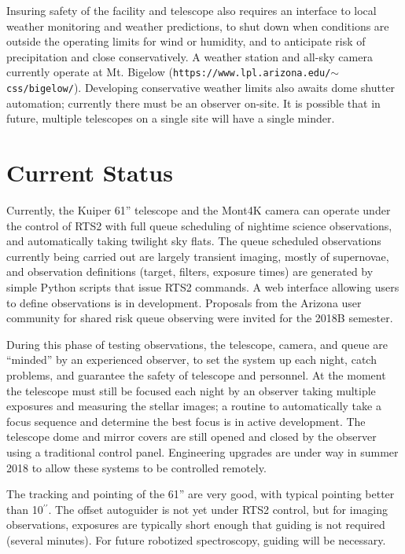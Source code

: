\documentclass[]{spie}  %
\def\arcsec{$^{\prime\prime}$}
\begin{document}
Insuring safety of the facility and telescope also requires an interface to local weather monitoring and weather predictions, to shut down when conditions are outside the operating limits for wind or humidity, and to anticipate risk of precipitation and close conservatively.  A weather station and all-sky camera currently operate at Mt. Bigelow ({\tt https://www.lpl.arizona.edu/$\sim$css/bigelow/}). Developing conservative weather limits also awaits dome shutter automation; currently there must be an observer on-site. It is possible that in future, multiple telescopes on a single site will have a single minder.

\section{Current Status}

Currently, the Kuiper 61'' telescope and the Mont4K camera can operate under the control of RTS2 with full queue scheduling of nightime science observations, and automatically taking twilight sky flats. 
The queue scheduled observations currently being carried out are largely transient imaging, mostly of supernovae, and observation definitions (target, filters, exposure times) are generated by simple Python scripts that issue RTS2 commands.  A web interface allowing users to define observations is in development. Proposals from the Arizona user community for shared risk queue observing were invited for the 2018B semester. 
 
During this phase of testing observations, the telescope, camera, and queue are ``minded'' by an experienced observer, to set the system up each night, catch problems, and guarantee the safety of telescope and personnel.
At the moment the telescope must still be focused each night by an observer taking multiple exposures and measuring the stellar images; a routine to automatically take a focus sequence and determine the best focus is in active development.  The telescope dome and mirror covers are still opened and closed by the observer using a traditional control panel. Engineering upgrades are under way in summer 2018 to allow these systems to be controlled remotely.

The tracking and pointing of the 61'' are very good, with typical pointing better than 10\arcsec. The offset autoguider is not yet under RTS2 control, but for imaging observations, exposures are typically short enough that guiding is not required (several minutes).  For future robotized spectroscopy, guiding will be necessary.
\end{document}
